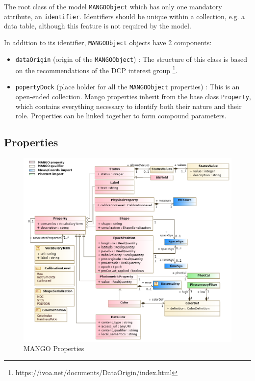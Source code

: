 \documentclass[11pt,a4paper]{ivoa}
\begin{document}
The root class of the model \texttt{MANGOObject} which has only
one mandatory attribute, an \texttt{identifier}.
Identifiers should be unique within a collection, e.g. a data table, although 
this feature is not required by the model.

In addition to its identifier, \texttt{MANGOObject} objects have 2 components:

\begin{itemize}[noitemsep,topsep=0pt,parsep=0pt,partopsep=0pt]

  \item \texttt{dataOrigin} (origin of the \texttt{MANGOObject}) : The structure of this class is based on
        the recommendations of the DCP interest group \footnote{https://ivoa.net/documents/DataOrigin/index.html}.
  \item \texttt{popertyDock} (place holder for all the \texttt{MANGOObject} properties) :
        This is an open-ended collection.
        Mango properties inherit from the base class \texttt{Property},
        which contains everything necessary to identify both their nature and their role.
        Properties can be linked together to form compound parameters.
\end{itemize}


\subsection{Properties}

      \begin{figure}[h]
        \includegraphics[width=1.0\textwidth]{../model/property.png}
        \caption{MANGO Properties}
        \label{fig:property}
      \end{figure}
\end{document}
